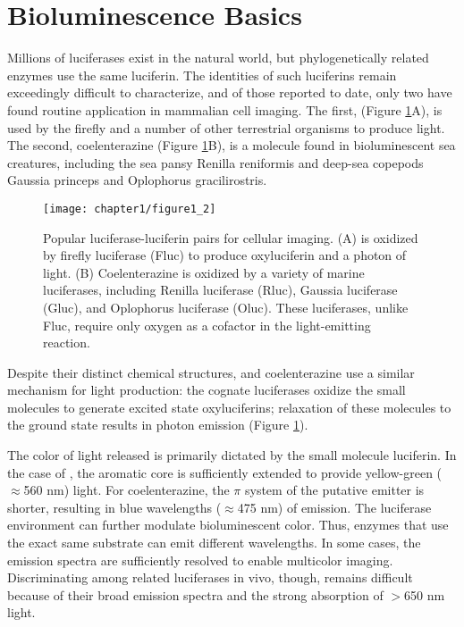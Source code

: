 \section{Bioluminescence Basics}
Millions of luciferases exist in the natural world, but
phylogenetically related enzymes use the same luciferin.\cite{Martini:2017ig} The
identities of such luciferins remain exceedingly difficult to
characterize, and of those reported to date, only two have found
routine application in mammalian cell imaging.\cite{RN26} The first, \dluciferin{}
(Figure \ref{fig:luc_oxidation}A), is used by the firefly and a number of
other terrestrial organisms to produce light. The second,
coelenterazine (Figure \ref{fig:luc_oxidation}B), is a molecule found in bioluminescent
sea creatures, including the sea pansy Renilla
reniformis and deep-sea copepods Gaussia princeps and
Oplophorus gracilirostris.

\begin{figure}[htbp]
\texttt{[image: chapter1/figure1\_2]}
\centering
\caption[Popular luciferase-luciferin pairs for cellular imaging]{Popular luciferase-luciferin pairs for cellular imaging. (A) \dluciferin{}
is oxidized by firefly luciferase (Fluc) to produce oxyluciferin
and a photon of light. (B) Coelenterazine is oxidized by a variety of
marine luciferases, including Renilla luciferase (Rluc), Gaussia
luciferase (Gluc), and Oplophorus luciferase (Oluc). These luciferases,
unlike Fluc, require only oxygen as a cofactor in the light-emitting
reaction.}
  \label{fig:luc_oxidation}
\end{figure}

Despite their distinct chemical
structures, \dluciferin{} and coelenterazine use a similar
mechanism for light production: the cognate luciferases oxidize
the small molecules to generate excited state oxyluciferins;
relaxation of these molecules to the ground state results in
photon emission (Figure \ref{fig:luc_oxidation}).

The color of light released is primarily dictated by the small
molecule luciferin. In the case of \dluciferin{}, the aromatic core
is sufficiently extended to provide yellow-green ($\approx$560 nm)
light. For coelenterazine, the $\pi$ system of the putative emitter is
shorter, resulting in blue wavelengths ($\approx$475 nm) of emission.
The luciferase environment can further modulate bioluminescent
color. Thus, enzymes that use the exact same substrate can
emit different wavelengths. In some cases, the emission spectra
are sufficiently resolved to enable multicolor imaging.\cite{Suzuki:2016jw}
Discriminating among related luciferases in vivo, though,
remains difficult because of their broad emission spectra and
the strong absorption of $>$650 nm light.\cite{Zhao:2005if}
